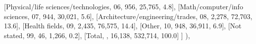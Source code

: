 \documentclass[
  11pt,
  a4paper,
]{article}
\newenvironment{Shaded}{\begin{snugshade}}{\end{snugshade}}
\newcommand{\NormalTok}[1]{\textcolor[rgb]{0.00,0.23,0.31}{#1}}
\newcommand{\StringTok}[1]{\textcolor[rgb]{0.13,0.47,0.30}{#1}}
\begin{document}
\begin{Shaded}
\begin{Highlighting}[]
\NormalTok{                [}\StringTok{\textquotesingle{}Physical/life sciences/technologies\textquotesingle{}}\NormalTok{, }\StringTok{\textquotesingle{}06\textquotesingle{}}\NormalTok{, }\StringTok{\textquotesingle{}956\textquotesingle{}}\NormalTok{, }\StringTok{\textquotesingle{}25,765\textquotesingle{}}\NormalTok{, }\StringTok{\textquotesingle{}4.8\textquotesingle{}}\NormalTok{],}
\NormalTok{                [}\StringTok{\textquotesingle{}Math/computer/info sciences\textquotesingle{}}\NormalTok{, }\StringTok{\textquotesingle{}07\textquotesingle{}}\NormalTok{, }\StringTok{\textquotesingle{}944\textquotesingle{}}\NormalTok{, }\StringTok{\textquotesingle{}30,021\textquotesingle{}}\NormalTok{, }\StringTok{\textquotesingle{}5.6\textquotesingle{}}\NormalTok{],}
\NormalTok{                [}\StringTok{\textquotesingle{}Architecture/engineering/trades\textquotesingle{}}\NormalTok{, }\StringTok{\textquotesingle{}08\textquotesingle{}}\NormalTok{, }\StringTok{\textquotesingle{}2,278\textquotesingle{}}\NormalTok{, }\StringTok{\textquotesingle{}72,703\textquotesingle{}}\NormalTok{, }\StringTok{\textquotesingle{}13.6\textquotesingle{}}\NormalTok{],}
\NormalTok{                [}\StringTok{\textquotesingle{}Health fields\textquotesingle{}}\NormalTok{, }\StringTok{\textquotesingle{}09\textquotesingle{}}\NormalTok{, }\StringTok{\textquotesingle{}2,435\textquotesingle{}}\NormalTok{, }\StringTok{\textquotesingle{}76,575\textquotesingle{}}\NormalTok{, }\StringTok{\textquotesingle{}14.4\textquotesingle{}}\NormalTok{],}
\NormalTok{                [}\StringTok{\textquotesingle{}Other\textquotesingle{}}\NormalTok{, }\StringTok{\textquotesingle{}10\textquotesingle{}}\NormalTok{, }\StringTok{\textquotesingle{}948\textquotesingle{}}\NormalTok{, }\StringTok{\textquotesingle{}36,911\textquotesingle{}}\NormalTok{, }\StringTok{\textquotesingle{}6.9\textquotesingle{}}\NormalTok{],}
\NormalTok{                [}\StringTok{\textquotesingle{}Not stated\textquotesingle{}}\NormalTok{, }\StringTok{\textquotesingle{}99\textquotesingle{}}\NormalTok{, }\StringTok{\textquotesingle{}46\textquotesingle{}}\NormalTok{, }\StringTok{\textquotesingle{}1,266\textquotesingle{}}\NormalTok{, }\StringTok{\textquotesingle{}0.2\textquotesingle{}}\NormalTok{],}
\NormalTok{                [}\StringTok{\textquotesingle{}Total\textquotesingle{}}\NormalTok{, }\StringTok{\textquotesingle{}\textquotesingle{}}\NormalTok{, }\StringTok{\textquotesingle{}16,138\textquotesingle{}}\NormalTok{, }\StringTok{\textquotesingle{}532,714\textquotesingle{}}\NormalTok{, }\StringTok{\textquotesingle{}100.0\textquotesingle{}}\NormalTok{]}
\NormalTok{                ]}
\NormalTok{            ),}
        

\end{Highlighting}
\end{Shaded}
\end{document}
